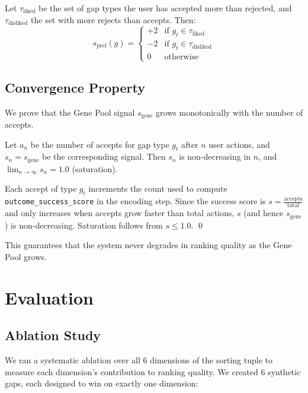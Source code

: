 \documentclass[anon,9pt]{article}
\begin{document}
Let $\tau_{\text{liked}}$ be the set of gap types the user has accepted more than rejected, and $\tau_{\text{disliked}}$ the set with more rejects than accepts. Then:
$$s_{\text{pref}}(g) = \begin{cases}
+2 & \text{if } g_t \in \tau_{\text{liked}} \\
-2 & \text{if } g_t \in \tau_{\text{disliked}} \\
0  & \text{otherwise}
\end{cases}$$

\subsection{Convergence Property}

We prove that the Gene Pool signal $s_{\text{gene}}$ grows monotonically with the number of accepts.

\begin{theorem}
Let $a_n$ be the number of accepts for gap type $g_t$ after $n$ user actions, and $s_n = s_{\text{gene}}$ be the corresponding signal. Then $s_n$ is non-decreasing in $n$, and $\lim_{n \to \infty} s_n = 1.0$ (saturation).
\end{theorem}

\begin{Proof}
Each accept of type $g_t$ increments the count used to compute \texttt{outcome\_success\_score} in the encoding step. Since the success score is $s = \frac{\text{accepts}}{\text{total}}$ and only increases when accepts grow faster than total actions, $s$ (and hence $s_{\text{gene}}$) is non-decreasing. Saturation follows from $s \leq 1.0$. \qed
\end{Proof}

This guarantees that the system never degrades in ranking quality as the Gene Pool grows.

\section{Evaluation}

\subsection{Ablation Study}

We ran a systematic ablation over all 6 dimensions of the sorting tuple to measure each dimension's contribution to ranking quality. We created 6 synthetic gaps, each designed to win on exactly one dimension:
\end{document}
